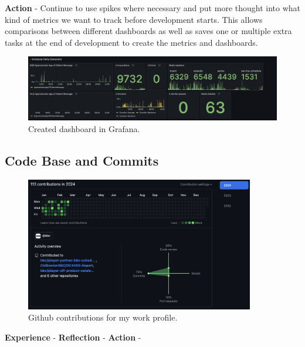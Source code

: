   \textbf{Action} - Continue to use spikes where necessary and put more thought into what kind of metrics we want to track before development starts.
  This allows comparisons between different dashboards as well as saves one or multiple extra tasks at the end of development to create the metrics and
  dashboards.

  \begin{figure}[H]
    \centering
    \includegraphics[width=12cm]{assets/outputs/dashboard.png}
    \caption{Created dashboard in Grafana.}
    \label{fig:dashboard}
  \end{figure}
  
  \newpage
  \subsection{Code Base and Commits}

  \begin{figure}[H]
    \centering
    \includegraphics[width=10cm]{assets/outputs/githubContributions.png}
    \caption{Github contributions for my work profile.}
    \label{fig:githubContributions}
  \end{figure}

  \textbf{Experience} -
  \textbf{Reflection} -
  \textbf{Action} -

\newpage
